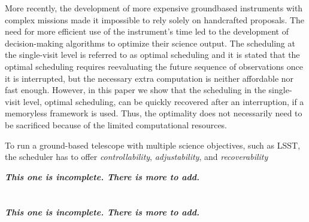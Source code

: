\documentclass{article}
\begin{document}
More recently, the development of more expensive groundbased instruments with complex missions made it impossible to
rely solely on handcrafted proposals. The need for more
efficient use of the instrument’s time led to the development of decision-making algorithms to optimize their science output.
The scheduling at the single-visit level is referred to as optimal scheduling and it is
stated that the optimal scheduling requires reevaluating the
future sequence of observations once it is interrupted, but the
necessary extra computation is neither affordable nor fast
enough. However, in this paper we show that the scheduling in
the single-visit level, optimal scheduling, can be quickly
recovered after an interruption, if a memoryless framework is
used. Thus, the optimality does not necessarily need to be
sacrificed because of the limited computational resources.

To run a ground-based telescope with multiple science
objectives, such as LSST, the scheduler has to offer
\textit{controllability}, \textit{adjustability}, and \textit{recoverability}

\textbf{\textit{This one is incomplete. There is more to add.}}

\section*{\cite{luo2018cost} }
\textbf{\textit{This one is incomplete. There is more to add.}}
\end{document}
